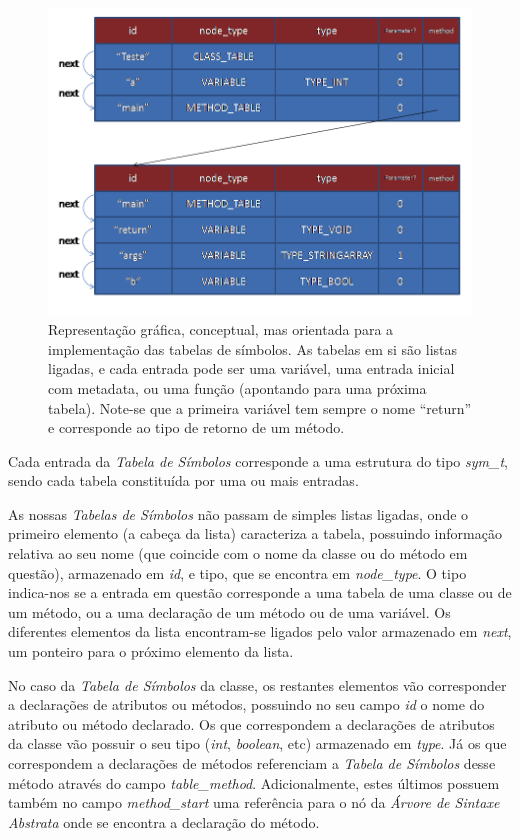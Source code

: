 \documentclass[11pt,a4paper]{article}
\begin{document}
	\begin{figure}[H]
  \centering
      \includegraphics[width=\textwidth,height=\textheight,keepaspectratio]{Symbol_Table.png}
  \caption{Representação gráfica, conceptual, mas orientada para a implementação das tabelas de símbolos. As tabelas em si são listas ligadas, e cada entrada pode ser uma variável, uma entrada inicial com metadata, ou uma função (apontando para uma próxima tabela). Note-se que a primeira variável tem sempre o nome ``return'' e corresponde ao tipo de retorno de um método.}
\end{figure}
	
	Cada entrada da \emph{Tabela de Símbolos} corresponde a uma estrutura do tipo \emph{sym\_t}, sendo cada tabela constituída por uma ou mais entradas.
	
	As nossas \emph{Tabelas de Símbolos} não passam de simples listas ligadas, onde o primeiro elemento (a cabeça da lista) caracteriza a tabela, possuindo informação relativa ao seu nome (que coincide com o nome da classe ou do método em questão), armazenado em \emph{id}, e tipo, que se encontra em \emph{node\_type}. O tipo indica-nos se a entrada em questão corresponde a uma tabela de uma classe ou de um método, ou a uma declaração de um método ou de uma variável. Os diferentes elementos da lista encontram-se ligados pelo valor armazenado em \emph{next}, um ponteiro para o próximo elemento da lista.
	
	No caso da \emph{Tabela de Símbolos} da classe, os restantes elementos vão corresponder a declarações de atributos ou métodos, possuindo no seu campo \emph{id} o nome do atributo ou método declarado. Os que correspondem a declarações de atributos da classe vão possuir o seu tipo (\emph{int}, \emph{boolean}, etc) armazenado em \emph{type}. Já os que correspondem a declarações de métodos referenciam a \emph{Tabela de Símbolos} desse método através do campo  \emph{table\_method}. Adicionalmente, estes últimos possuem também no campo \emph{method\_start} uma referência para o nó da \emph{Árvore de Sintaxe Abstrata} onde se encontra a declaração do método.
	
\end{document}
